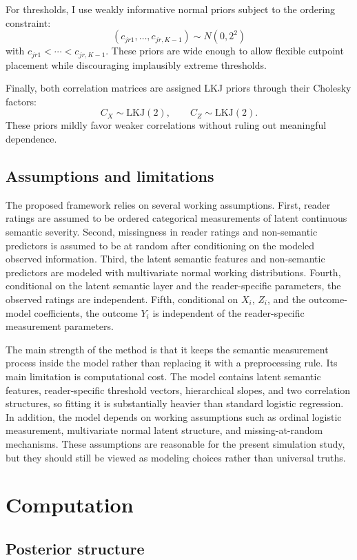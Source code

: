 \documentclass[twoside,11pt]{article}
\begin{document}
For thresholds, I use weakly informative normal priors subject to the ordering constraint:
\[
(c_{jr1},\dots,c_{jr,K-1}) \sim N(0,2^2)
\]
with $c_{jr1}<\cdots<c_{jr,K-1}$. These priors are wide enough to allow flexible cutpoint placement while discouraging implausibly extreme thresholds.

Finally, both correlation matrices are assigned LKJ priors through their Cholesky factors:
\[
C_X \sim \text{LKJ}(2), \qquad C_Z \sim \text{LKJ}(2).
\]
These priors mildly favor weaker correlations without ruling out meaningful dependence.

\subsection{Assumptions and limitations}

The proposed framework relies on several working assumptions. First, reader ratings are assumed to be ordered categorical measurements of latent continuous semantic severity. Second, missingness in reader ratings and non-semantic predictors is assumed to be at random after conditioning on the modeled observed information. Third, the latent semantic features and non-semantic predictors are modeled with multivariate normal working distributions. Fourth, conditional on the latent semantic layer and the reader-specific parameters, the observed ratings are independent. Fifth, conditional on $X_i$, $Z_i$, and the outcome-model coefficients, the outcome $Y_i$ is independent of the reader-specific measurement parameters.

The main strength of the method is that it keeps the semantic measurement process inside the model rather than replacing it with a preprocessing rule. Its main limitation is computational cost. The model contains latent semantic features, reader-specific threshold vectors, hierarchical slopes, and two correlation structures, so fitting it is substantially heavier than standard logistic regression. In addition, the model depends on working assumptions such as ordinal logistic measurement, multivariate normal latent structure, and missing-at-random mechanisms. These assumptions are reasonable for the present simulation study, but they should still be viewed as modeling choices rather than universal truths.

\section{Computation}

\subsection{Posterior structure}
\end{document}
